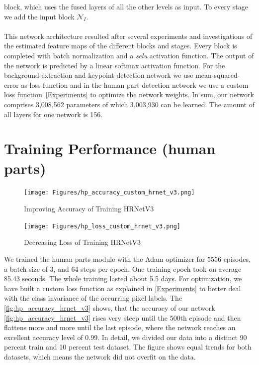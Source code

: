 block, which uses the fused layers of all the other levels as input.
To every stage we add the input block $\mathcal{N}_I$.
\\\mbox{}\\
This network architecture resulted after several experiments and investigations of the estimated feature maps of the
different blocks and stages.
Every block is completed with batch normalization and a \textit{selu} activation function.
The output of the network is predicted by a linear softmax activation function.
For the background-extraction and keypoint detection network we use mean-squared-error as loss function and in the
human part detection network we use a custom loss function~\autoref{Experiments} to optimize the network weights.
In sum, our network comprises 3,008,562 parameters of which 3,003,930 can be learned.
The amount of all layers for one network is 156.\\







\section{Training Performance (human parts)}
\begin{figure}
    \centering
    \texttt{[image: Figures/hp\_accuracy\_custom\_hrnet\_v3.png]}
    \decoRule
    \caption[HRNetv3 Training Process: Accuracy]{Improving Accuracy of Training HRNetV3}
    \label{fig:hp_accuracy_hrnet_v3}
\end{figure}
\begin{figure}
    \centering
    \texttt{[image: Figures/hp\_loss\_custom\_hrnet\_v3.png]}
    \decoRule
    \caption[HRNetv3 Training Process: Loss]{Decreasing Loss  of Training HRNetV3}
    \label{fig:hp_loss_hrnet_v3}
\end{figure}

We trained the human parts module with the Adam optimizer for 5556 episodes, a batch size of 3, and 64 steps per epoch.
One training epoch took on average 85.43 seconds. The whole training lasted about 5.5 days.
For optimization, we have built a custom loss function as explained in
\autoref{Experiments} to better deal with the class invariance of the occurring pixel labels.
The \autoref{fig:hp_accuracy_hrnet_v3} shows, that the accuracy of our network
\autoref{fig:hp_accuracy_hrnet_v3} rises very steep until the 500th episode and then flattens more and more until the last
episode, where the network reaches an excellent accuracy level of 0.99.
In detail, we divided our data into a distinct 90 percent train and 10 percent test dataset.
The figure shows equal trends for both datasets, which means the network did not overfit on the data.\

